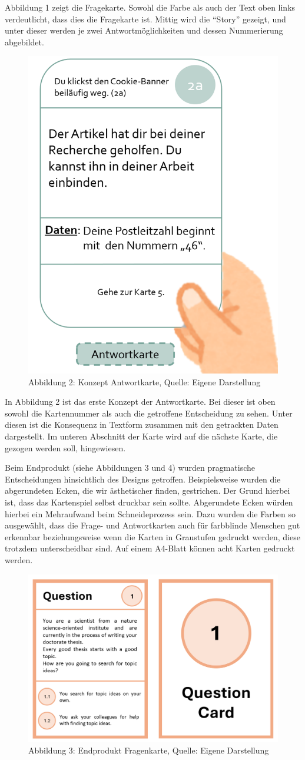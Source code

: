 \documentclass[a4paper,
fontsize=11pt,
oneside,
numbers=noperiodatend,
parskip=half-,
bibliography=totoc,
final
]{scrartcl}
\begin{document}
Abbildung 1 zeigt die Fragekarte. Sowohl die Farbe als auch der Text
oben links verdeutlicht, dass dies die Fragekarte ist. Mittig wird die
\enquote{Story} gezeigt, und unter dieser werden je zwei
Antwortmöglichkeiten und dessen Nummerierung abgebildet.

\begin{figure}[H]
\centering
\includegraphics[width=.3\textwidth]{img/Abb2-Antwortkarte.png}
\caption{Abbildung 2: Konzept Antwortkarte, Quelle: Eigene Darstellung}
\end{figure}

In Abbildung 2 ist das erste Konzept der Antwortkarte. Bei dieser ist
oben sowohl die Kartennummer als auch die getroffene Entscheidung zu
sehen. Unter diesen ist die Konsequenz in Textform zusammen mit den
getrackten Daten dargestellt. Im unteren Abschnitt der Karte wird auf
die nächste Karte, die gezogen werden soll, hingewiesen.

Beim Endprodukt (siehe Abbildungen 3 und 4) wurden pragmatische
Entscheidungen hinsichtlich des Designs getroffen. Beispielsweise wurden
die abgerundeten Ecken, die wir ästhetischer finden, gestrichen. Der
Grund hierbei ist, dass das Kartenspiel selbst druckbar sein sollte.
Abgerundete Ecken würden hierbei ein Mehraufwand beim Schneideprozess
sein. Dazu wurden die Farben so ausgewählt, dass die Frage- und
Antwortkarten auch für farbblinde Menschen gut erkennbar beziehungsweise
wenn die Karten in Graustufen gedruckt werden, diese trotzdem
unterscheidbar sind. Auf einem A4-Blatt können acht Karten gedruckt
werden.

\begin{figure}[H]
\centering
\includegraphics[width=.5\textwidth]{img/Abb3.png}
\caption{Abbildung 3: Endprodukt Fragenkarte, Quelle: Eigene
Darstellung}
\end{figure}
\end{document}
